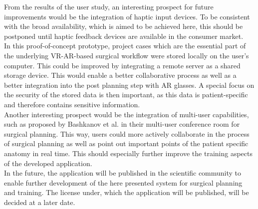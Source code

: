 From the results of the user study, an interesting prospect for
future improvements would be the integration of 
haptic input devices. 
To be consistent with the broad availability, which is
aimed to be achieved here, this should be postponed
until haptic feedback devices are available
in the consumer market. 
\\ In this proof-of-concept prototype, project
cases which are the essential part of the underlying VR-AR-based
surgical workflow were stored locally on the user's 
computer. This could be improved by integrating a remote server as 
a shared storage device. 
This would enable a better collaborative process as well as a 
better integration into the post planning step with AR glasses.
A special focus on the security of the stored data is then 
important, as this data is patient-specific and therefore 
contains sensitive information.
\\ Another interesting prospect would be the integration of multi-user
capabilities, such as proposed by Bashkanov et al. \cite{RN43} in their
multi-user conference room for surgical planning. 
This way, users could more actively collaborate in the process 
of surgical planning as well as point out 
important points of the patient specific anatomy in real time.
This should especially further improve the training aspects of 
the developed application. 
\\ In the future, the application will be published in the scientific community to enable further development of the here presented system for surgical planning and training.
The license under, which the application will be published, will be decided at a later date.